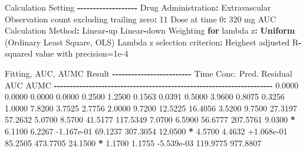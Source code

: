 \documentclass[
  12pt,
]{krantz}
\newenvironment{Shaded}{\begin{snugshade}}{\end{snugshade}}
\newcommand{\ControlFlowTok}[1]{\textcolor[rgb]{0.13,0.29,0.53}{\textbf{#1}}}
\newcommand{\DecValTok}[1]{\textcolor[rgb]{0.00,0.00,0.81}{#1}}
\newcommand{\FloatTok}[1]{\textcolor[rgb]{0.00,0.00,0.81}{#1}}
\newcommand{\KeywordTok}[1]{\textcolor[rgb]{0.13,0.29,0.53}{\textbf{#1}}}
\newcommand{\NormalTok}[1]{#1}
\newcommand{\OperatorTok}[1]{\textcolor[rgb]{0.81,0.36,0.00}{\textbf{#1}}}
\newcommand{\StringTok}[1]{\textcolor[rgb]{0.31,0.60,0.02}{#1}}
\begin{document}
\begin{Shaded}
\begin{Highlighting}[]
\NormalTok{Calculation Setting}
\OperatorTok{{-}{-}{-}{-}{-}{-}{-}{-}{-}{-}{-}{-}{-}{-}{-}{-}{-}{-}{-}}
\NormalTok{Drug Administration}\OperatorTok{:}\StringTok{ }\NormalTok{Extravascular}
\NormalTok{Observation count excluding trailing zero}\OperatorTok{:}\StringTok{ }\DecValTok{11}
\NormalTok{Dose at time }\DecValTok{0}\OperatorTok{:}\StringTok{ }\DecValTok{320}\NormalTok{ mg}
\NormalTok{AUC Calculation Method}\OperatorTok{:}\StringTok{ }\NormalTok{Linear}\OperatorTok{{-}}\NormalTok{up Linear}\OperatorTok{{-}}\NormalTok{down}
\NormalTok{Weighting }\ControlFlowTok{for}\NormalTok{ lambda z}\OperatorTok{:}\StringTok{ }\KeywordTok{Uniform}\NormalTok{ (Ordinary Least Square, OLS)}
\NormalTok{Lambda z selection criterion}\OperatorTok{:}\StringTok{ }\NormalTok{Heighest adjusted R}\OperatorTok{{-}}\NormalTok{squared value with precision=}\FloatTok{1e{-}4}


\NormalTok{Fitting, AUC, AUMC Result}
\OperatorTok{{-}{-}{-}{-}{-}{-}{-}{-}{-}{-}{-}{-}{-}{-}{-}{-}{-}{-}{-}{-}{-}{-}{-}{-}{-}}
\StringTok{      }\NormalTok{Time         Conc.      Pred.   Residual       AUC       AUMC}
\OperatorTok{{-}{-}{-}{-}{-}{-}{-}{-}{-}{-}{-}{-}{-}{-}{-}{-}{-}{-}{-}{-}{-}{-}{-}{-}{-}{-}{-}{-}{-}{-}{-}{-}{-}{-}{-}{-}{-}{-}{-}{-}{-}{-}{-}{-}{-}{-}{-}{-}{-}{-}{-}{-}{-}{-}{-}{-}{-}{-}{-}{-}{-}{-}{-}{-}{-}{-}{-}{-}{-}}
\StringTok{     }\FloatTok{0.0000}       \FloatTok{0.0000}                           \FloatTok{0.0000}     \FloatTok{0.0000}
     \FloatTok{0.2500}       \FloatTok{1.2500}                           \FloatTok{0.1563}     \FloatTok{0.0391}
     \FloatTok{0.5000}       \FloatTok{3.9600}                           \FloatTok{0.8075}     \FloatTok{0.3256}
     \FloatTok{1.0000}       \FloatTok{7.8200}                           \FloatTok{3.7525}     \FloatTok{2.7756}
     \FloatTok{2.0000}       \FloatTok{9.7200}                          \FloatTok{12.5225}    \FloatTok{16.4056}
     \FloatTok{3.5200}       \FloatTok{9.7500}                          \FloatTok{27.3197}    \FloatTok{57.2632}
     \FloatTok{5.0700}       \FloatTok{8.5700}                          \FloatTok{41.5177}   \FloatTok{117.5349}
     \FloatTok{7.0700}       \FloatTok{6.5900}                          \FloatTok{56.6777}   \FloatTok{207.5761}
     \FloatTok{9.0300} \OperatorTok{*}\StringTok{     }\FloatTok{6.1100}     \FloatTok{6.2267} \FloatTok{{-}1.167e{-}01}    \FloatTok{69.1237}   \FloatTok{307.3054}
    \FloatTok{12.0500} \OperatorTok{*}\StringTok{     }\FloatTok{4.5700}     \FloatTok{4.4632} \FloatTok{+1.068e{-}01}    \FloatTok{85.2505}   \FloatTok{473.7705}
    \FloatTok{24.1500} \OperatorTok{*}\StringTok{     }\FloatTok{1.1700}     \FloatTok{1.1755} \FloatTok{{-}5.539e{-}03}   \FloatTok{119.9775}   \FloatTok{977.8807}


\end{Highlighting}
\end{Shaded}
\end{document}

